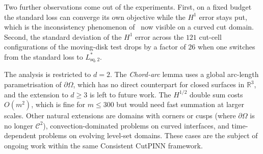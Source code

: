 \documentclass[11pt]{article}
\newcommand{\bOmg}{\partial\Omega}
\newcommand{\C}{\mathcal{C}}
\begin{document}
Two further observations come out of the experiments. First, on a
fixed budget the standard loss can converge its own objective while
the $H^1$ error stays put, which is the inconsistency phenomenon
of~\cite{bonito2025} now visible on a curved cut domain. Second,
the standard deviation of the $H^1$ error across the $121$ cut-cell
configurations of the moving-disk test drops by a factor of $26$
when one switches from the standard loss to $L^*_{\mathrm{sq},2}$.

The analysis is restricted to $d=2$. The \textit{Chord-arc} lemma uses a
global arc-length parametrisation of $\bOmg$, which has no direct
counterpart for closed surfaces in $\mathbb{R}^3$, and the extension
to $d\ge 3$ is left to future work. The $H^{1/2}$ double sum costs
$O(m^2)$, which is fine for $m\le 300$ but would need fast summation
at larger scales. Other natural extensions are domains with corners
or cusps (where $\bOmg$ is no longer $\C^2$), convection-dominated
problems on curved interfaces, and time-dependent problems on
evolving level-set domains. These cases are the subject of ongoing
work within the same Consistent CutPINN framework.


 
 
\end{document}

